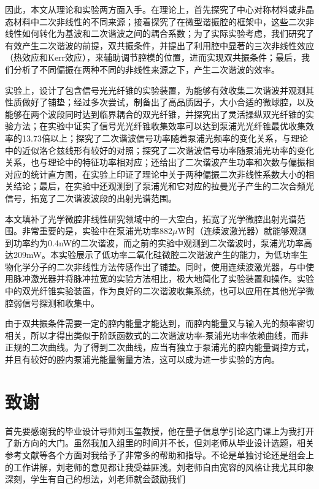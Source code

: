 \documentclass[UTF8,a4paper,cs4size,hyperref]{ctexart}
\begin{document}
因此，本文从理论和实验两方面入手。在理论上，首先探究了中心对称材料或非晶态材料中二次非线性的不同来源；接着探究了在微型谐振腔的框架中，这些二次非线性如何转化为基波和二次谐波之间的耦合系数；为了实际实验考虑，我们研究了有效产生二次谐波的前提，双共振条件，并提出了利用腔中显著的三次非线性效应（热效应和Kerr效应），来辅助调节腔模的位置，进而实现双共振条件；最后，我们分析了不同偏振在两种不同的非线性来源之下，产生二次谐波的效率。

实验上，设计了包含信号光光纤锥的实验装置，为能够有效收集二次谐波并观测其性质做好了铺垫；经过多次尝试，制备出了高品质因子，大小合适的微球腔，以及能够在两个波段同时达到临界耦合的双光纤锥，并探究出了灵活操纵双光纤锥的实验方法；在实验中证实了信号光光纤锥收集效率可以达到泵浦光光纤锥最优收集效率的13.73倍以上；探究了二次谐波信号功率随着泵浦光频率的变化关系，与理论中的近似洛仑兹线形有较好的对照；探究了二次谐波信号功率随泵浦光功率的变化关系，也与理论中的特征功率相对应；还给出了二次谐波产生功率和次数与偏振相对应的统计直方图，在实验上印证了理论中关于两种偏振二次非线性系数大小的相关结论；最后，在实验中还观测到了泵浦光和它对应的拉曼光子产生的二次合频光信号，拓宽了二次谐波波段的出射光谱范围。

本文填补了光学微腔非线性研究领域中的一大空白，拓宽了光学微腔出射光谱范围。非常重要的是，实验中在泵浦光功率882$\mu$W时（连续波激光器）就能够观测到功率约为0.4nW的二次谐波，而之前的实验中观测到二次谐波时，泵浦光功率高达209mW\cite{asano2016visible}。本实验展示了低功率二氧化硅微腔二次谐波产生的能力，为低功率生物化学分子的二次非线性方法传感作出了铺垫。同时，使用连续波激光器，与\cite{dominguez2011whispering}中使用脉冲激光器并将脉冲拉宽的实验方法相比，极大地简化了实验装置和操作。实验中的双光纤锥实验装置，作为良好的二次谐波收集系统，也可以应用在其他光学微腔弱信号探测和收集中。

由于双共振条件需要一定的腔内能量才能达到，而腔内能量又与输入光的频率密切相关，所以才得出类似于阶跃函数式的二次谐波功率-泵浦光功率依赖曲线，而非正规的二次曲线。为了得到二次曲线，应当有独立于泵浦光的腔内能量调控方式，并且有较好的腔内泵浦光能量衡量方法，这可以成为进一步实验的方向。

\section{致谢}

首先要感谢我的毕业设计导师刘玉玺教授，他在量子信息学引论这门课上为我打开了新方向的大门。虽然我加入组里的时间并不长，但刘老师从毕业设计选题，相关参考文献等各个方面对我给予了非常多的帮助和指导。不论是单独讨论还是组会上的工作讲解，刘老师的意见都让我受益匪浅。刘老师自由宽容的风格让我尤其印象深刻，学生有自己的想法，刘老师就会鼓励我们



\newpage

\end{document}
